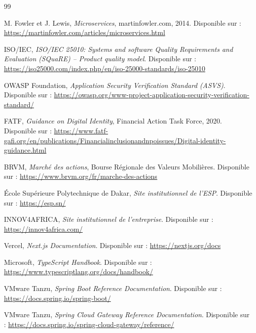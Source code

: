 \documentclass[a4paper,12pt]{report}
\begin{document}
\renewcommand{\bibname}{Références bibliographiques}
\begin{thebibliography}{99}
{}

M. Fowler et J. Lewis, \textit{Microservices}, martinfowler.com, 2014.
Disponible sur : \url{https://martinfowler.com/articles/microservices.html}

ISO/IEC, \textit{ISO/IEC 25010: Systems and software Quality Requirements and Evaluation (SQuaRE) -- Product quality model}.
Disponible sur : \url{https://iso25000.com/index.php/en/iso-25000-standards/iso-25010}

OWASP Foundation, \textit{Application Security Verification Standard (ASVS)}.
Disponible sur : \url{https://owasp.org/www-project-application-security-verification-standard/}

FATF, \textit{Guidance on Digital Identity}, Financial Action Task Force, 2020.
Disponible sur : \url{https://www.fatf-gafi.org/en/publications/Financialinclusionandnpoissues/Digital-identity-guidance.html}

BRVM, \textit{Marché des actions}, Bourse Régionale des Valeurs Mobilières.
Disponible sur : \url{https://www.brvm.org/fr/marche-des-actions}

École Supérieure Polytechnique de Dakar, \textit{Site institutionnel de l'ESP}.
Disponible sur : \url{https://esp.sn/}

INNOV4AFRICA, \textit{Site institutionnel de l'entreprise}.
Disponible sur : \url{https://innov4africa.com/}

Vercel, \textit{Next.js Documentation}.
Disponible sur : \url{https://nextjs.org/docs}

Microsoft, \textit{TypeScript Handbook}.
Disponible sur : \url{https://www.typescriptlang.org/docs/handbook/}

VMware Tanzu, \textit{Spring Boot Reference Documentation}.
Disponible sur : \url{https://docs.spring.io/spring-boot/}

VMware Tanzu, \textit{Spring Cloud Gateway Reference Documentation}.
Disponible sur : \url{https://docs.spring.io/spring-cloud-gateway/reference/}


\end{thebibliography}
\end{document}

